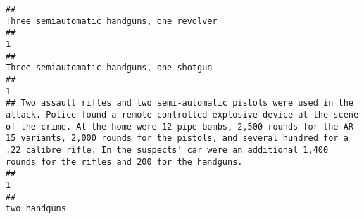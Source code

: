\documentclass[
]{article}
\begin{document}
\begin{verbatim}
##                                                                                                                                                                                                                                                                                                                                                            Three semiautomatic handguns, one revolver 
##                                                                                                                                                                                                                                                                                                                                                                                                     1 
##                                                                                                                                                                                                                                                                                                                                                             Three semiautomatic handguns, one shotgun 
##                                                                                                                                                                                                                                                                                                                                                                                                     1 
## Two assault rifles and two semi-automatic pistols were used in the attack. Police found a remote controlled explosive device at the scene of the crime. At the home were 12 pipe bombs, 2,500 rounds for the AR-15 variants, 2,000 rounds for the pistols, and several hundred for a .22 calibre rifle. In the suspects' car were an additional 1,400 rounds for the rifles and 200 for the handguns. 
##                                                                                                                                                                                                                                                                                                                                                                                                     1 
##                                                                                                                                                                                                                                                                                                                                                                                          two handguns 

\end{verbatim}
\end{document}
